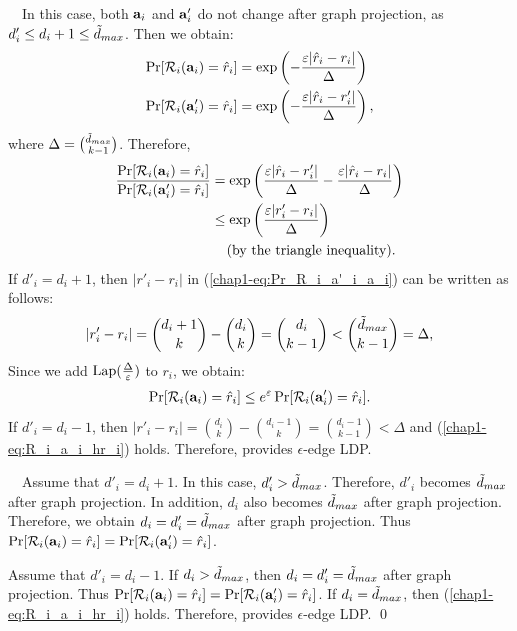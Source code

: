 {\smallskip
{}~~In this case, both $\mathbf{a}_i$ and $\mathbf{a}'_i$ do not change after graph projection, as $d'_i \leq d_i + 1 \leq \tilde{d}_{max}$. 
Then we obtain:
\begin{align*}
\Pr[\mathcal{R}_i(\mathbf{a}_i) = \hat{r}_i] &= \exp\left(-\frac{\varepsilon |\hat{r}_i- r_i|}{\Delta}\right) \\
\Pr[\mathcal{R}_i(\mathbf{a}'_i) = \hat{r}_i] &= \exp\left(-\frac{\varepsilon |\hat{r}_i- r'_i|}{\Delta}\right),
\end{align*}
where $\Delta = \binom{\tilde{d}_{max}}{k-1}$. 
Therefore, 
\begin{align}
\frac{\Pr[\mathcal{R}_i(\mathbf{a}_i) = \hat{r}_i]}{\Pr[\mathcal{R}_i(\mathbf{a}'_i) = \hat{r}_i]} 
&= \exp\left( \frac{\varepsilon |\hat{r}_i- r'_i|}{\Delta} - \frac{\varepsilon |\hat{r}_i- r_i|}{\Delta}\right) \nonumber\\
&\leq  \exp\left( \frac{\varepsilon |r'_i- r_i|}{\Delta} \right) \label{chap1-eq:Pr_R_i_a'_i_a_i}\\
& \hspace{4mm} (\text{by the triangle inequality}). \nonumber
\end{align}
If $d'_i = d_i + 1$, then $|r'_i- r_i|$ in (\ref{chap1-eq:Pr_R_i_a'_i_a_i}) can be written as follows:
\begin{align*}
|r'_i- r_i| 
= \binom{d_i+1}{k} - \binom{d_i}{k} 
= \binom{d_i}{k-1}
< \binom{\tilde{d}_{max}}{k-1}
= \Delta, 
\end{align*}
Since we add $\textrm{Lap}(\frac{\Delta}{\varepsilon})$ to $r_i$, we obtain:
\begin{align}
\Pr[\mathcal{R}_i(\mathbf{a}_i) = \hat{r}_i] \leq e^\varepsilon \Pr[\mathcal{R}_i(\mathbf{a}'_i) = \hat{r}_i]. 
\label{chap1-eq:R_i_a_i_hr_i}
\end{align}
If $d'_i = d_i - 1$, then $|r'_i- r_i| = \binom{d_i}{k} - \binom{d_i-1}{k} = \binom{d_i-1}{k-1} < \Delta$ and (\ref{chap1-eq:R_i_a_i_hr_i}) holds. 
Therefore,  provides $\epsilon$-edge LDP. 

\smallskip
{}~~Assume 
that $d'_i = d_i + 1$. 
In this case, $d'_i > \tilde{d}_{max}$. 
Therefore, $d'_i$ becomes $\tilde{d}_{max}$ after graph projection. 
In addition, 
$d_i$ also becomes $\tilde{d}_{max}$ after graph projection. 
Therefore, we obtain 
$d_i = d'_i = \tilde{d}_{max}$ after graph projection. 
Thus 
$\Pr[\mathcal{R}_i(\mathbf{a}_i) = \hat{r}_i] = \Pr[\mathcal{R}_i(\mathbf{a}'_i) = \hat{r}_i]$. 

Assume that $d'_i = d_i - 1$. 
If $d_i > \tilde{d}_{max}$, then $d_i = d'_i = \tilde{d}_{max}$ after graph projection. 
Thus $\Pr[\mathcal{R}_i(\mathbf{a}_i) = \hat{r}_i] = \Pr[\mathcal{R}_i(\mathbf{a}'_i) = \hat{r}_i]$. 
If $d_i = \tilde{d}_{max}$, then (\ref{chap1-eq:R_i_a_i_hr_i}) holds. 
Therefore,  provides $\epsilon$-edge LDP. \qed

}
